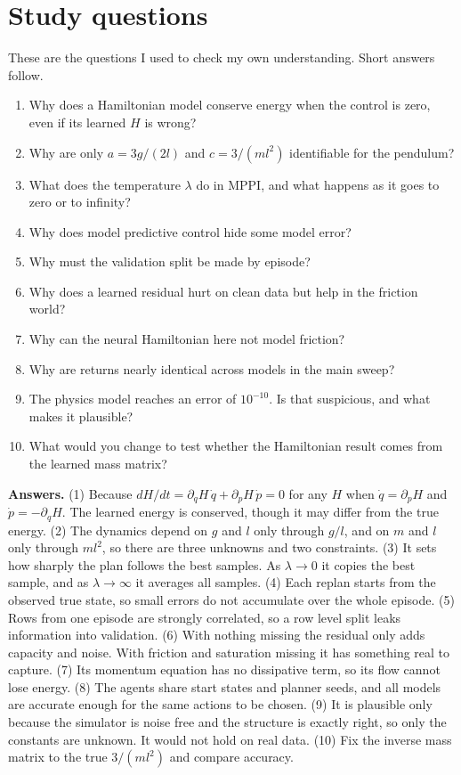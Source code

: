 \documentclass[11pt,a4paper]{article}
\begin{document}
\section{Study questions}
These are the questions I used to check my own understanding. Short answers follow.
\begin{enumerate}[leftmargin=1.8em]
\item Why does a Hamiltonian model conserve energy when the control is zero, even if its learned $H$ is wrong?
\item Why are only $a=3g/(2l)$ and $c=3/(ml^2)$ identifiable for the pendulum?
\item What does the temperature $\lambda$ do in MPPI, and what happens as it goes to zero or to infinity?
\item Why does model predictive control hide some model error?
\item Why must the validation split be made by episode?
\item Why does a learned residual hurt on clean data but help in the friction world?
\item Why can the neural Hamiltonian here not model friction?
\item Why are returns nearly identical across models in the main sweep?
\item The physics model reaches an error of $10^{-10}$. Is that suspicious, and what makes it plausible?
\item What would you change to test whether the Hamiltonian result comes from the learned mass matrix?
\end{enumerate}
\textbf{Answers.}
(1) Because $dH/dt=\partial_q H\,\dot q+\partial_p H\,\dot p=0$ for any $H$ when $\dot q=\partial_p H$ and $\dot p=-\partial_q H$. The learned energy is conserved, though it may differ from the true energy.
(2) The dynamics depend on $g$ and $l$ only through $g/l$, and on $m$ and $l$ only through $ml^2$, so there are three unknowns and two constraints.
(3) It sets how sharply the plan follows the best samples. As $\lambda\to0$ it copies the best sample, and as $\lambda\to\infty$ it averages all samples.
(4) Each replan starts from the observed true state, so small errors do not accumulate over the whole episode.
(5) Rows from one episode are strongly correlated, so a row level split leaks information into validation.
(6) With nothing missing the residual only adds capacity and noise. With friction and saturation missing it has something real to capture.
(7) Its momentum equation has no dissipative term, so its flow cannot lose energy.
(8) The agents share start states and planner seeds, and all models are accurate enough for the same actions to be chosen.
(9) It is plausible only because the simulator is noise free and the structure is exactly right, so only the constants are unknown. It would not hold on real data.
(10) Fix the inverse mass matrix to the true $3/(ml^2)$ and compare accuracy.
\end{document}
